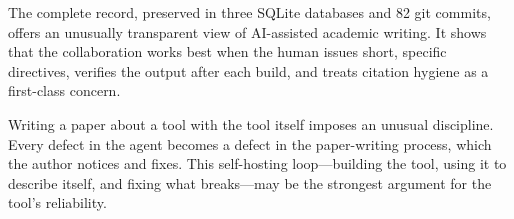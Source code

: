 \documentclass{article}
\begin{document}
The complete record, preserved in three SQLite databases and 82 git commits, offers an unusually transparent view of AI-assisted academic writing.  It shows that the collaboration works best when the human issues short, specific directives, verifies the output after each build, and treats citation hygiene as a first-class concern.

Writing a paper about a tool with the tool itself imposes an unusual discipline.  Every defect in the agent becomes a defect in the paper-writing process, which the author notices and fixes.  This self-hosting loop---building the tool, using it to describe itself, and fixing what breaks---may be the strongest argument for the tool's reliability.



\end{document}
